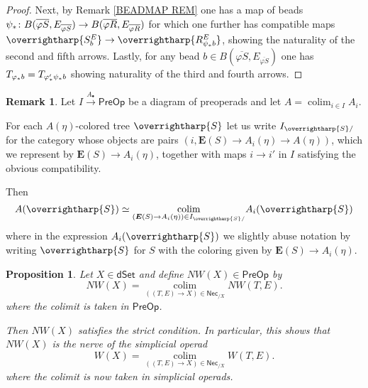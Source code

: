 \documentclass[a4paper,10pt
,draft
]{article}%
\numberwithin{equation}{section}
\numberwithin{figure}{section}
\newtheorem{proposition}[equation]{Proposition}%
\theoremstyle{definition} %
\newtheorem{remark}[equation]{Remark}%
\newcommand{\vect}[1]{\text{\overrightharp{\ensuremath{#1}}}}
\DeclareMathOperator{\colim}{colim}%
\newcommand{\1}{\ensuremath{\mathbbm 1}}%
\begin{document}
\begin{proof}
Next, by Remark \ref{BEADMAP REM}
one has a map of beads
$\psi_{\**} \colon 
B(\overline{\varphi S},E_{\overline{\varphi S}})
\to
B(\overline{\varphi R},E_{\overline{\varphi R}})$
for which one further has compatible maps
$\vect{S^{E}_b}
\to 
\vect{R^{E}_{\psi_{\**}b}}$,
showing the naturality of the second and fifth arrows.
Lastly, for any bead 
$b \in B(\overline{\varphi S},E_{\overline{\varphi S}})$
one has
$T_{\varphi_{\**}b} = T_{\varphi'_{\**} \psi_{\**}b}$
showing naturality of the third and fourth arrows.
\end{proof}




\begin{remark}\label{PREOPCOLEV REM}
	Let $I \xrightarrow{A_{\bullet}} \mathsf{PreOp}$
	be a diagram of preoperads and let
	$A = \colim_{i \in I} A_i$.
	
	For each $A(\eta)$-colored tree $\vect{S}$
	let us write
	$I_{\vect{S}/}$
	for the category whose objects are pairs
	$(i,\boldsymbol{E}(S) \to A_i(\eta) \to A(\eta))$,
	which we represent by 
	$\boldsymbol{E}(S) \to A_i(\eta)$,
	together with maps $i \to i'$ in $I$
	satisfying the obvious compatibility.
	
	Then
\[
	A(\vect{S}) \simeq 
	\underset{(\boldsymbol{E}(S) \to A_i(\eta)) \in I_{\vect{S}/}}{\colim}
	A_i(\vect{S})
\]
where in the expression $A_i(\vect{S})$
we slightly abuse notation by writing $\vect{S}$
for $S$ with the coloring given by
$\boldsymbol{E}(S) \to A_i(\eta)$.
\end{remark}





\begin{proposition}
      \label{NWKANEX_PROP}
	Let $X \in \mathsf{dSet}$ and define
	$NW(X) \in \mathsf{PreOp}$ by
\begin{equation}\label{NWKANEX EQ}
	NW(X) =
	\underset{((T,E) \to X)
	\in \mathsf{Nec}_{/X}}{\colim}
	NW(T,E).
\end{equation}
	where the colimit is taken in $\mathsf{PreOp}$.
	
	Then $NW(X)$ satisfies the strict condition.
%
	In particular, this shows that 	
	$NW(X)$ is the nerve of the simplicial operad
\[
W(X) =
\underset{((T,E) \to X)
	\in \mathsf{Nec}_{/X}}{\colim}
W(T,E).
\]
where the colimit is now taken in simplicial operads.
\end{proposition}
\end{document}

